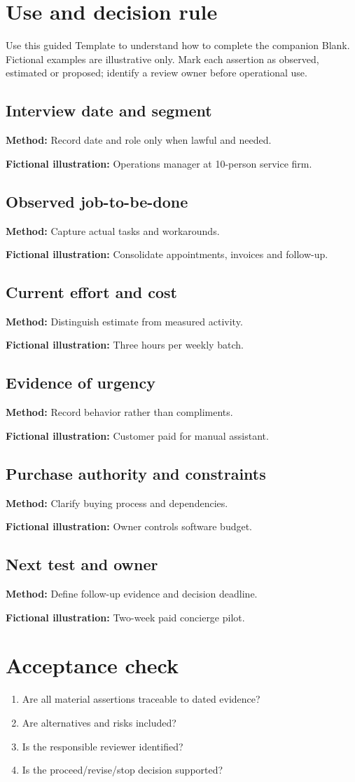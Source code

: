 \documentclass[11pt]{article}
\begin{document}
\SuiteOpen
\section{Use and decision rule}
Use this guided Template to understand how to complete the companion Blank. Fictional examples are illustrative only. Mark each assertion as observed, estimated or proposed; identify a review owner before operational use.
\subsection*{Interview date and segment}
\textbf{Method:} Record date and role only when lawful and needed.\par\textbf{Fictional illustration:} Operations manager at 10-person service firm.\par
\subsection*{Observed job-to-be-done}
\textbf{Method:} Capture actual tasks and workarounds.\par\textbf{Fictional illustration:} Consolidate appointments, invoices and follow-up.\par
\subsection*{Current effort and cost}
\textbf{Method:} Distinguish estimate from measured activity.\par\textbf{Fictional illustration:} Three hours per weekly batch.\par
\subsection*{Evidence of urgency}
\textbf{Method:} Record behavior rather than compliments.\par\textbf{Fictional illustration:} Customer paid for manual assistant.\par
\subsection*{Purchase authority and constraints}
\textbf{Method:} Clarify buying process and dependencies.\par\textbf{Fictional illustration:} Owner controls software budget.\par
\subsection*{Next test and owner}
\textbf{Method:} Define follow-up evidence and decision deadline.\par\textbf{Fictional illustration:} Two-week paid concierge pilot.\par
\section{Acceptance check}
\begin{enumerate}[leftmargin=*,itemsep=5pt]
\item Are all material assertions traceable to dated evidence?
\item Are alternatives and risks included?
\item Is the responsible reviewer identified?
\item Is the proceed/revise/stop decision supported?
\end{enumerate}
\end{document}
